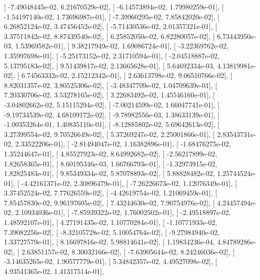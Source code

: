 \documentclass{article}
\begin{document}
       [ -7.49048445e-02,   6.21670529e-02],
       [ -6.14573894e-02,   1.79980259e-01],
       [ -1.54197140e-02,   1.73696987e-01],
       [ -7.39960295e-02,   7.85842020e-02],
       [  6.26852124e-02,   3.47456452e-02],
       [ -5.71430536e-02,   2.01357321e-01],
       [  3.37511842e-02,   8.87439540e-02],
       [  6.25852050e-02,   6.82280057e-02],
       [  6.73443950e-03,   1.53969582e-01],
       [  9.38217949e-02,   1.69086724e-01],
       [ -3.22369762e-02,   1.35997698e-01],
       [ -5.25173152e-02,   2.31710594e-01],
       [ -2.04518887e-02,   5.13795183e-02],
       [  9.51439817e-02,   2.13665628e-01],
       [  5.64692334e-03,   4.13819981e-02],
       [  6.74563332e-02,   2.15212342e-01],
       [  2.63613798e-02,   9.06510766e-02],
       [  8.82031357e-02,   3.80525306e-02],
       [ -3.48347709e-02,   1.04709639e-01],
       [  7.20330706e-02,   3.53278165e-02],
       [  3.22683492e-02,   1.45546160e-01],
       [ -3.04802662e-02,   5.15115294e-02],
       [ -7.00214599e-02,   1.66047741e-01],
       [ -9.19734539e-02,   4.68109172e-02],
       [ -9.78982556e-03,   1.38633139e-01],
       [ -1.00353264e-01,   1.40835110e-01],
       [ -8.12885802e-02,   5.69642613e-02],
       [  3.27399554e-02,   9.70526649e-02],
       [  5.37269247e-02,   2.25001866e-01],
       [  2.83543731e-02,   2.33522206e-01],
       [ -2.81494047e-02,   1.16382896e-01],
       [ -1.68476275e-02,   1.35244647e-01],
       [  4.85527923e-02,   8.64992682e-02],
       [ -2.56217899e-02,   1.82658365e-01],
       [  8.60195346e-03,   1.66766793e-01],
       [ -1.32973915e-02,   1.82825483e-01],
       [  9.85349334e-02,   5.87078893e-02],
       [  5.88828482e-02,   1.25744524e-01],
       [ -4.42161371e-02,   2.30896479e-01],
       [ -7.26226673e-02,   1.12076349e-01],
       [  3.37452524e-02,   7.77626559e-02],
       [ -4.42619754e-02,   1.21069459e-01],
       [  7.85457830e-02,   9.96197605e-02],
       [  7.43244630e-02,   7.90754976e-02],
       [  4.24457494e-02,   2.10934036e-01],
       [ -7.85939322e-02,   1.76002502e-01],
       [ -2.49518897e-02,   1.48592107e-01],
       [  4.27191435e-02,   1.10770284e-01],
       [ -1.10771933e-02,   7.39082256e-02],
       [ -8.32105728e-02,   5.10054764e-02],
       [ -9.27984940e-02,   1.33727579e-01],
       [  8.16697816e-02,   5.98814641e-02],
       [  1.19834236e-04,   4.84789286e-02],
       [  2.63851157e-02,   8.30032166e-02],
       [ -7.63905644e-02,   8.24246036e-02],
       [ -3.14635265e-02,   1.90577779e-01],
       [  5.34842357e-02,   4.49527098e-02],
       [  4.93541365e-02,   1.41317514e-01],
\end{document}
